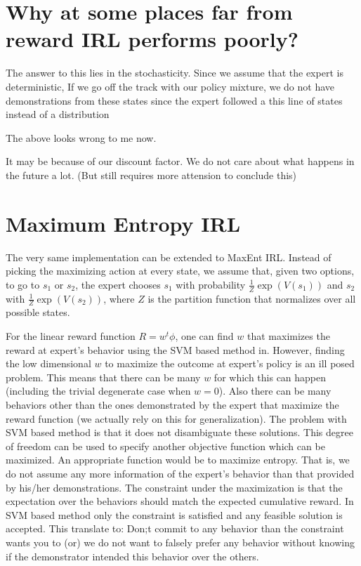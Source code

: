 \documentclass{article}[11pt]
\begin{document}
\section{Why at some places far from reward IRL performs poorly?}
The answer to this lies in the stochasticity. Since we assume that the expert is deterministic, If we go off the track with our policy mixture, we do not have demonstrations from these states since the expert followed a this line of states instead of a distribution

The above looks wrong to me now. 

It may be because of our discount factor. We do not care about what happens in the future a lot. (But still requires more attension to conclude this)

\section{Maximum Entropy IRL}
The very same implementation can be extended to MaxEnt IRL. Instead of picking the maximizing action at every state, we assume that, given two options, to go to $s_1$ or $s_2$, the expert chooses $s_1$ with probability $\frac{1}{Z}\exp(V(s_1))$ and $s_2$ with $\frac{1}{Z}\exp(V(s_2))$, where $Z$ is the partition function that normalizes over all possible states. 

For the linear reward function $R = w^t\phi$, one can find $w$ that maximizes the reward at expert's behavior using the SVM based method in. However, finding the low dimensional $w$ to maximize the outcome at expert's policy is an ill posed problem. This means that there can be many $w$ for which this can happen (including the trivial degenerate case when $w = 0$). Also there can be many behaviors other than the ones demonstrated by the expert that maximize the reward function (we actually rely on this for generalization). The problem with SVM based method is that it does not disambiguate these solutions. This degree of freedom can be used to specify another objective function which can be maximized. An appropriate function would be to maximize entropy. That is, we do not assume any more information of the expert's behavior than that provided by his/her demonstrations. The constraint under the maximization is that the expectation over the behaviors should match the expected cumulative reward. In SVM based method only the constraint is satisfied and any feasible solution is accepted. This translate to: Don;t commit to any behavior than the constraint wants you to (or) we do not want to falsely prefer any behavior without knowing if the demonstrator intended this behavior over the others. 
\end{document}
